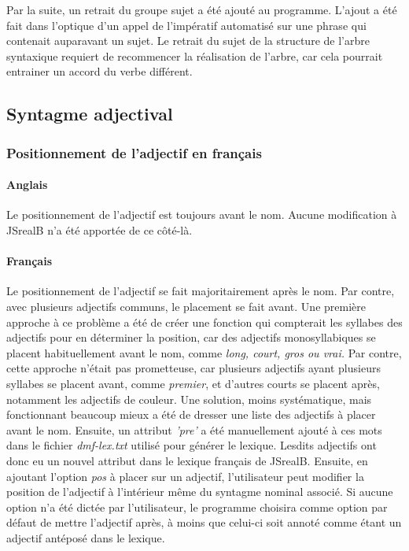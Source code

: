 \documentclass[11pt]{article} %
\newcommand{\system}[1]{\textsf{#1}}
\newcommand{\JSB}{\system{JSrealB}}
\begin{document}
Par la suite, un retrait du groupe sujet a été ajouté au programme.
L'ajout a été fait dans l'optique d'un appel de l'impératif automatisé
sur une phrase qui contenait auparavant un sujet. Le retrait du sujet
de la structure de l'arbre syntaxique requiert de recommencer la réalisation
de l'arbre, car cela pourrait entrainer un accord du verbe différent.


\subsection{Syntagme adjectival}
\subsubsection{Positionnement de l'adjectif en français}
\paragraph{Anglais} Le positionnement de l'adjectif est toujours avant le nom. 
Aucune modification à \JSB{} n'a été apportée de ce côté-là.
\paragraph{Français}
Le positionnement de l'adjectif se fait majoritairement
après le nom. Par contre, avec plusieurs adjectifs communs, le placement
se fait avant.\cite{gramGrevisse} Une première approche à ce problème a été de créer
une fonction qui compterait les syllabes des adjectifs pour en déterminer
la position, car des adjectifs monosyllabiques se placent habituellement
avant le nom, comme \emph{long, court, gros ou vrai.} Par contre,
cette approche n'était pas prometteuse, car plusieurs adjectifs ayant
plusieurs syllabes se placent avant, comme \emph{premier}, et d'autres
courts se placent après, notamment les adjectifs de couleur. Une solution,
moins systématique, mais fonctionnant beaucoup mieux a été de dresser
une liste des adjectifs à placer avant le nom. Ensuite, un attribut
\emph{'pre'} a été manuellement ajouté à ces mots dans le fichier
\emph{dmf-lex.txt }utilisé pour générer le lexique. Lesdits adjectifs
ont donc eu un nouvel attribut dans le lexique français de \JSB{}.
Ensuite, en ajoutant l'option \emph{pos} à placer sur un adjectif,
l'utilisateur peut modifier la position de l'adjectif à l'intérieur
même du syntagme nominal associé. Si aucune option n'a été dictée
par l'utilisateur, le programme choisira comme option par défaut de
mettre l'adjectif après, à moins que celui-ci soit annoté comme étant
un adjectif antéposé dans le lexique. 
\end{document}
